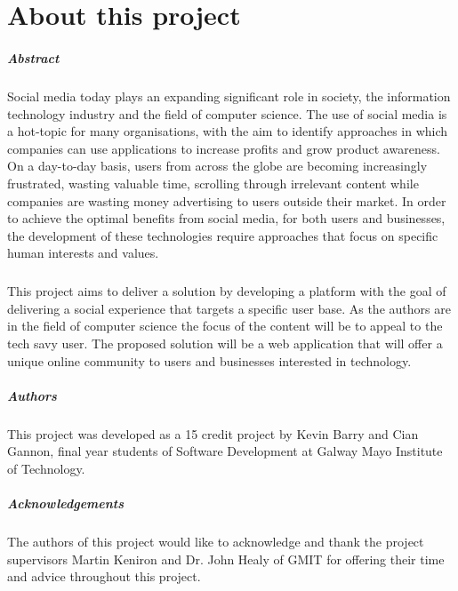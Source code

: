 
\chapter*{About this project}
\paragraph{Abstract}
Social media today plays an expanding significant role in society, the information technology industry and the field of computer science. The use of social media is a hot-topic for many organisations, with the aim to identify approaches in which companies can use applications to increase profits and grow product awareness. On a day-to-day basis, users from across the globe are becoming increasingly frustrated, wasting valuable time, scrolling through irrelevant content while companies are wasting money advertising to users outside their market.  In order to achieve the optimal benefits from social media, for both users and businesses, the development of these technologies require approaches that focus on specific human interests and values.

\paragraph{}
This project aims to deliver a solution by developing a platform with the goal of delivering a social experience that targets a specific user base. As the authors are in the field of computer science the focus of the content will be to appeal to the tech savy user. The proposed solution will be a web application that will offer a unique online community to users and businesses interested in technology. 

\paragraph{Authors}
This project was developed as a 15 credit project by Kevin Barry and Cian Gannon, final year students of Software Development at Galway Mayo Institute of Technology.

\paragraph{Acknowledgements}
The authors of this project would like to acknowledge and thank the project supervisors Martin Keniron and Dr. John Healy of GMIT for offering their time and advice throughout this project.















